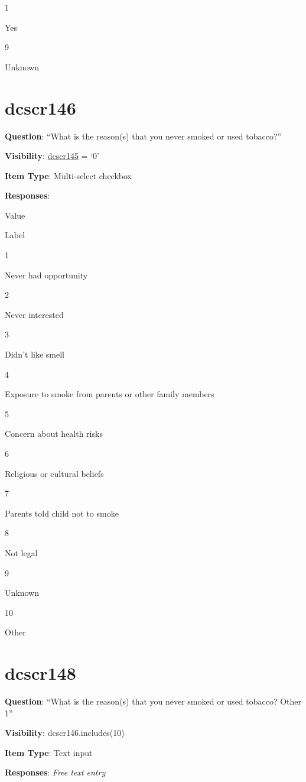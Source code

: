 \documentclass[]{book}
\begin{document}
1

Yes

9

Unknown

\hypertarget{dcscr146}{%
\section{dcscr146}\label{dcscr146}}

\textbf{Question}: ``What is the reason(s) that you never smoked or used tobacco?''

\textbf{Visibility}: \protect\hyperlink{dcscr145}{dcscr145} = `0'

\textbf{Item Type}: Multi-select checkbox

\textbf{Responses}:

Value

Label

1

Never had opportunity

2

Never interested

3

Didn't like smell

4

Exposure to smoke from parents or other family members

5

Concern about health risks

6

Religious or cultural beliefs

7

Parents told child not to smoke

8

Not legal

9

Unknown

10

Other

\hypertarget{dcscr148}{%
\section{dcscr148}\label{dcscr148}}

\textbf{Question}: ``What is the reason(s) that you never smoked or used tobacco? Other 1''

\textbf{Visibility}: dcscr146.includes(10)

\textbf{Item Type}: Text input

\textbf{Responses}: \emph{Free text entry}
\end{document}
